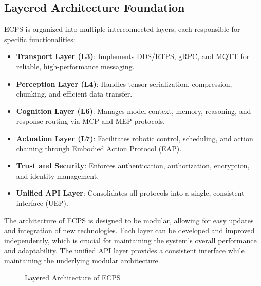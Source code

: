 \documentclass[12pt]{article}
\begin{document}
\subsection{Layered Architecture Foundation}
ECPS is organized into multiple interconnected layers, each responsible for specific functionalities:

\begin{itemize}
  \item \textbf{Transport Layer (L3)}: Implements DDS/RTPS, gRPC, and MQTT for reliable, high-performance messaging.
  \item \textbf{Perception Layer (L4)}: Handles tensor serialization, compression, chunking, and efficient data transfer.
  \item \textbf{Cognition Layer (L6)}: Manages model context, memory, reasoning, and response routing via MCP and MEP protocols.
  \item \textbf{Actuation Layer (L7)}: Facilitates robotic control, scheduling, and action chaining through Embodied Action Protocol (EAP).
  \item \textbf{Trust and Security}: Enforces authentication, authorization, encryption, and identity management.
  \item \textbf{Unified API Layer}: Consolidates all protocols into a single, consistent interface (UEP).
\end{itemize}

The architecture of ECPS is designed to be modular, allowing for easy updates and integration of new technologies. Each layer can be developed and improved independently, which is crucial for maintaining the system's overall performance and adaptability. The unified API layer provides a consistent interface while maintaining the underlying modular architecture.

\begin{figure}[H]
\centering
{}
\caption{Layered Architecture of ECPS}
\end{figure}
\end{document}
